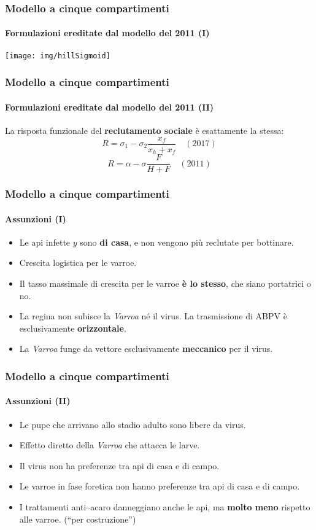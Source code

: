 \documentclass[]{beamer}
\begin{document}
\begin{frame}
    \frametitle{Modello a cinque compartimenti}
    \framesubtitle{Formulazioni ereditate dal modello del 2011 (I)}

    \begin{center}
            \texttt{[image: img/hillSigmoid]}
    \end{center}
\end{frame}

\begin{frame}
    \frametitle{Modello a cinque compartimenti}
    \framesubtitle{Formulazioni ereditate dal modello del 2011 (II)}

    La risposta funzionale del \textbf{reclutamento sociale} è esattamente la stessa:
    $$R = \sigma_1 - \sigma_2 \frac{x_f}{x_h+x_f} \quad (2017)$$
    \pause
    $$R = \alpha - \sigma \frac{F}{H+F} \quad (2011)$$
\end{frame}

\begin{frame}
    \frametitle{Modello a cinque compartimenti}
    \framesubtitle{Assunzioni (I)}

    \begin{itemize}
        \item \pause Le api infette $y$ sono \textbf{di casa}, \pause
            e non vengono più reclutate per bottinare.
        \item \pause Crescita logistica per le varroe.
        \item \pause Il tasso massimale di crescita per le varroe \textbf{è lo stesso},
            che siano portatrici o no.
        \item \pause La regina non subisce la \emph{Varroa} né il virus.
            \pause La trasmissione di ABPV è esclusivamente \textbf{orizzontale}.
        \item \pause La \emph{Varroa} funge da vettore esclusivamente \textbf{meccanico} per il virus.
    \end{itemize}
\end{frame}

\begin{frame}
    \frametitle{Modello a cinque compartimenti}
    \framesubtitle{Assunzioni (II)}

    \begin{itemize}
        \item Le pupe che arrivano allo stadio adulto sono libere da virus.
        \item \pause Effetto diretto della \emph{Varroa} che attacca le larve.
        \item \pause Il virus non ha preferenze tra api di casa e di campo.
        \item \pause Le varroe in fase foretica non hanno preferenze tra api di casa e di campo.
        \item \pause I trattamenti anti--acaro danneggiano anche le api,
            ma \textbf{molto meno} rispetto alle varroe. \pause (``per costruzione'')
    \end{itemize}
\end{frame}
\end{document}
